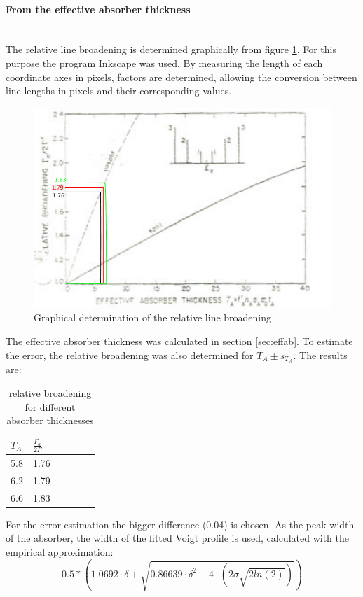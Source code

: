 \paragraph{From the effective absorber thickness} \ \\
The relative line broadening is determined graphically from figure \ref{fig:absorberthicknessevaluated}. For this purpose the program Inkscape was used. By measuring the length of each coordinate axes in pixels, factors are determined, allowing the conversion between line lengths in pixels and their corresponding values.\\
\begin{figure}[hbp]
	\centering
	\includegraphics[width=1.0\linewidth]{graphics/absorberthicknessevaluated}
	\caption{Graphical determination of the relative line broadening\cite{Frauenfelder}}
	\label{fig:absorberthicknessevaluated}
\end{figure}
The effective absorber thickness was calculated in section \ref{sec:effab}. To estimate the error, the relative broadening was also determined for $T_A\pm s_{T_A}$. The results are:
\begin{table}[H]\centering
	\begin{tabular}{@{}llllll@{}}
		\toprule
		$T_A$ & $\frac{\Gamma_a}{2\Gamma}$ \\
		\midrule
		5.8 & 1.76\\
		6.2 & 1.79 \\
		6.6 & 1.83 \\
	\end{tabular}
	\caption[relative broadening]{relative broadening for different absorber thicknesses}
	\label{tb:relative broadening}
\end{table}
For the error estimation the bigger difference (0.04) is chosen. As the peak width of the absorber, the width of the fitted Voigt profile is used, calculated with the empirical  approximation\cite{Olivero}:
\begin{equation}
0.5*(1.0692\cdot \delta+\sqrt{0.86639\cdot \delta^2 + 4\cdot (2\sigma\sqrt{2ln(2)})})
\end{equation}




